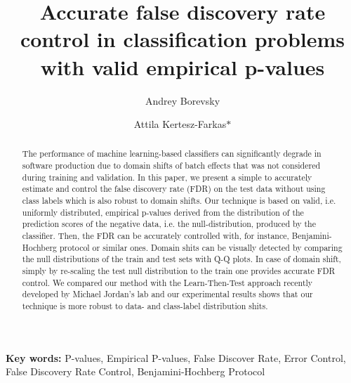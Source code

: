 \documentclass{article}
\author{Andrey Borevsky}
\author{Attila Kertesz-Farkas$\ast$}
\affil{Laboratory on AI for Computational Biology, Faculty of Computer Science, HSE University,  11 Pokrovsky Bvld., Moscow 109028, Russian Federation}
\title{Accurate false discovery rate control in classification problems with valid empirical p-values}
\begin{document}
\maketitle

\begin{abstract}
	The performance of machine learning-based classifiers can significantly degrade in software production due to domain shifts of batch effects that was not considered during training and validation. In this paper, we present a simple to accurately estimate and control the false discovery rate (FDR) on the test data without using class labels which is also robust to domain shifts. Our technique is based on valid, i.e. uniformly distributed, empirical p-values derived from the distribution of the prediction scores of the negative data, i.e. the null-distribution, produced by the classifier. Then, the FDR can be accurately controlled with, for instance, Benjamini-Hochberg protocol or similar ones. Domain shits can be visually detected by comparing the null distributions of the train and test sets with Q-Q plots. In case of domain shift, simply by re-scaling the test null distribution to the train one provides  accurate FDR control. We compared our method with the Learn-Then-Test approach recently developed by Michael Jordan's lab and our experimental results shows that our technique is more robust to data- and class-label distribution shits. 
	
	 


\end{abstract}
\textbf{Key words:} P-values, Empirical P-values, False Discover Rate, Error Control, False Discovery Rate Control, Benjamini-Hochberg Protocol
\end{document}
